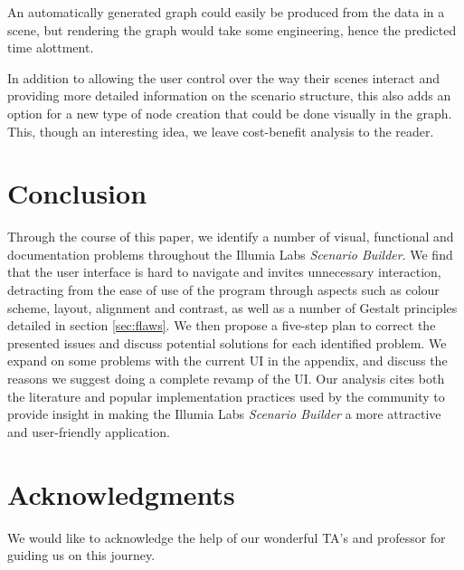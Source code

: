 \documentclass[sigart]{acmart_mod} %
\begin{document}
An automatically generated graph could easily be produced from the data in a scene, but rendering the graph would take some engineering, hence the predicted time alottment.

In addition to allowing the user control over the way their scenes interact and providing more detailed information on the scenario structure, this also adds an option for a new type of node creation that could be done visually in the graph. This, though an interesting idea, we leave cost-benefit analysis to the reader.

\section{Conclusion}
Through the course of this paper, we identify a number of visual, functional and documentation problems throughout the Illumia Labs \textit{Scenario Builder}. We find that the user interface is hard to navigate and invites unnecessary interaction, detracting from the ease of use of the program through aspects such as colour scheme, layout, alignment and contrast, as well as a number of Gestalt principles detailed in section \ref{sec:flaws}. We then propose a five-step plan to correct the presented issues and discuss potential solutions for each identified problem. We expand on some problems with the current UI in the appendix, and discuss the reasons we suggest doing a complete revamp of the UI. Our analysis cites both the literature and popular implementation practices used by the community to provide insight in making the Illumia Labs \textit{Scenario Builder} a more attractive and user-friendly application.

\section{Acknowledgments}
We would like to acknowledge the help of our wonderful TA's and professor for guiding us on this journey.



\end{document}
